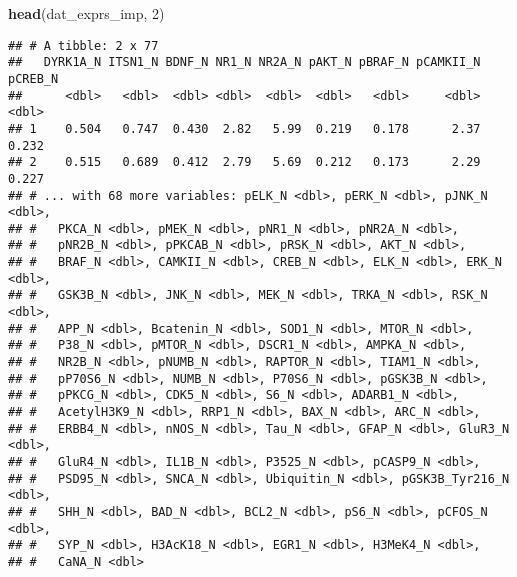 \documentclass[]{article}
\newenvironment{Shaded}{\begin{snugshade}}{\end{snugshade}}
\newcommand{\KeywordTok}[1]{\textcolor[rgb]{0.13,0.29,0.53}{\textbf{#1}}}
\newcommand{\DataTypeTok}[1]{\textcolor[rgb]{0.13,0.29,0.53}{#1}}
\newcommand{\DecValTok}[1]{\textcolor[rgb]{0.00,0.00,0.81}{#1}}
\newcommand{\FloatTok}[1]{\textcolor[rgb]{0.00,0.00,0.81}{#1}}
\newcommand{\StringTok}[1]{\textcolor[rgb]{0.31,0.60,0.02}{#1}}
\newcommand{\CommentTok}[1]{\textcolor[rgb]{0.56,0.35,0.01}{\textit{#1}}}
\newcommand{\ControlFlowTok}[1]{\textcolor[rgb]{0.13,0.29,0.53}{\textbf{#1}}}
\newcommand{\OperatorTok}[1]{\textcolor[rgb]{0.81,0.36,0.00}{\textbf{#1}}}
\newcommand{\NormalTok}[1]{#1}
\begin{document}
\begin{Shaded}
\begin{Highlighting}[]
\KeywordTok{head}\NormalTok{(dat_exprs_imp, }\DecValTok{2}\NormalTok{)}
\end{Highlighting}
\end{Shaded}

\begin{verbatim}
## # A tibble: 2 x 77
##   DYRK1A_N ITSN1_N BDNF_N NR1_N NR2A_N pAKT_N pBRAF_N pCAMKII_N pCREB_N
##      <dbl>   <dbl>  <dbl> <dbl>  <dbl>  <dbl>   <dbl>     <dbl>   <dbl>
## 1    0.504   0.747  0.430  2.82   5.99  0.219   0.178      2.37   0.232
## 2    0.515   0.689  0.412  2.79   5.69  0.212   0.173      2.29   0.227
## # ... with 68 more variables: pELK_N <dbl>, pERK_N <dbl>, pJNK_N <dbl>,
## #   PKCA_N <dbl>, pMEK_N <dbl>, pNR1_N <dbl>, pNR2A_N <dbl>,
## #   pNR2B_N <dbl>, pPKCAB_N <dbl>, pRSK_N <dbl>, AKT_N <dbl>,
## #   BRAF_N <dbl>, CAMKII_N <dbl>, CREB_N <dbl>, ELK_N <dbl>, ERK_N <dbl>,
## #   GSK3B_N <dbl>, JNK_N <dbl>, MEK_N <dbl>, TRKA_N <dbl>, RSK_N <dbl>,
## #   APP_N <dbl>, Bcatenin_N <dbl>, SOD1_N <dbl>, MTOR_N <dbl>,
## #   P38_N <dbl>, pMTOR_N <dbl>, DSCR1_N <dbl>, AMPKA_N <dbl>,
## #   NR2B_N <dbl>, pNUMB_N <dbl>, RAPTOR_N <dbl>, TIAM1_N <dbl>,
## #   pP70S6_N <dbl>, NUMB_N <dbl>, P70S6_N <dbl>, pGSK3B_N <dbl>,
## #   pPKCG_N <dbl>, CDK5_N <dbl>, S6_N <dbl>, ADARB1_N <dbl>,
## #   AcetylH3K9_N <dbl>, RRP1_N <dbl>, BAX_N <dbl>, ARC_N <dbl>,
## #   ERBB4_N <dbl>, nNOS_N <dbl>, Tau_N <dbl>, GFAP_N <dbl>, GluR3_N <dbl>,
## #   GluR4_N <dbl>, IL1B_N <dbl>, P3525_N <dbl>, pCASP9_N <dbl>,
## #   PSD95_N <dbl>, SNCA_N <dbl>, Ubiquitin_N <dbl>, pGSK3B_Tyr216_N <dbl>,
## #   SHH_N <dbl>, BAD_N <dbl>, BCL2_N <dbl>, pS6_N <dbl>, pCFOS_N <dbl>,
## #   SYP_N <dbl>, H3AcK18_N <dbl>, EGR1_N <dbl>, H3MeK4_N <dbl>,
## #   CaNA_N <dbl>
\end{verbatim}

\begin{Shaded}
\end{Shaded}
\end{document}
